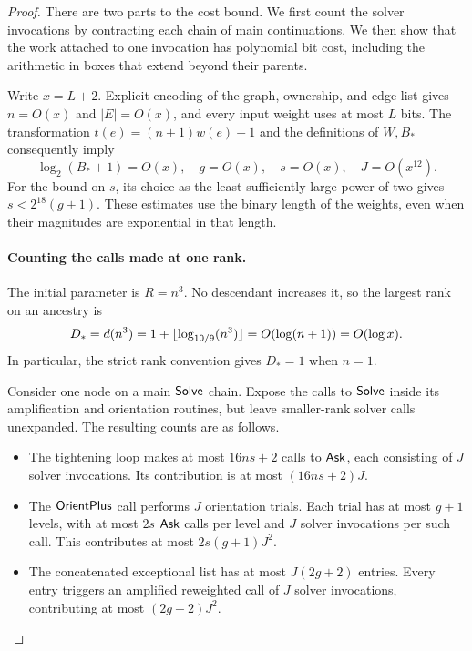 \begin{proof}
There are two parts to the cost bound. We first count the solver
invocations by contracting each chain of main continuations. We then
show that the work attached to one invocation has polynomial bit
cost, including the arithmetic in boxes that extend beyond their
parents.

Write \(x=L+2\). Explicit encoding of the graph, ownership, and edge
list gives \(n=O(x)\) and \(|E|=O(x)\), and every input weight uses
at most \(L\) bits. The transformation \(t(e)=(n+1)w(e)+1\) and
the definitions of \(W,B_*\) consequently imply
\begin{equation}\label{cost:parameter-sizes}
 \log_2(B_*+1)=O(x),\quad
 g=O(x),\quad s=O(x),\quad J=O(x^{12}).
\end{equation}
For the bound on \(s\), its choice as the least sufficiently large
power of two gives \(s<2^{18}(g+1)\). These estimates use the binary
length of the weights, even when their magnitudes are exponential
in that length.

\paragraph{Counting the calls made at one rank.}
The initial parameter is \(R=n^3\). No descendant increases it, so
the largest rank on an ancestry is
\begin{equation}\label{cost:initial-rank}
 D_*=d(n^3)
     =1+\lfloor\log_{10/9}(n^3)\rfloor
     =O(\log(n+1))=O(\log x).
\end{equation}
In particular, the strict rank convention gives \(D_*=1\) when
\(n=1\).

Consider one node on a main \(\mathsf{Solve}\) chain. Expose the calls to
\(\mathsf{Solve}\) inside its amplification and orientation routines, but
leave smaller-rank solver calls unexpanded. The resulting counts are
as follows.

\begin{itemize}
\item The tightening loop makes at most \(16ns+2\) calls to
\(\mathsf{Ask}\), each consisting of \(J\) solver invocations. Its
contribution is at most \((16ns+2)J\).
\item The \(\mathsf{OrientPlus}\) call performs \(J\) orientation trials.
Each trial has at most \(g+1\) levels, with at most \(2s\)
\(\mathsf{Ask}\) calls per level and \(J\) solver invocations per such
call. This contributes at most \(2s(g+1)J^2\).
\item The concatenated exceptional list has at most \(J(2g+2)\)
entries. Every entry triggers an amplified reweighted call of
\(J\) solver invocations, contributing at most \((2g+2)J^2\).
\end{itemize}


\end{proof}
